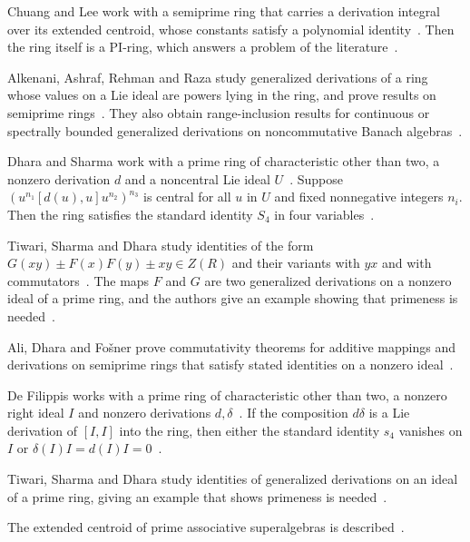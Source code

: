 Chuang and Lee work with a semiprime ring that carries a derivation integral
over its extended centroid, whose constants satisfy a polynomial identity~\cite{WlAlgebraicDerivationsWithConsta2003}.
Then the ring itself is a PI-ring, which answers a problem of the
literature~\cite{WlAlgebraicDerivationsWithConsta2003}.

Alkenani, Ashraf, Rehman and Raza study generalized derivations of a ring
whose values on a Lie ideal are powers lying in the ring, and prove results on
semiprime rings~\cite{WlDerivationsWithPowerValuesOnLi2015}. They also obtain range-inclusion results for continuous or
spectrally bounded generalized derivations on noncommutative Banach
algebras~\cite{WlDerivationsWithPowerValuesOnLi2015}.

Dhara and Sharma work with a prime ring of characteristic other than two, a
nonzero derivation $d$ and a noncentral Lie ideal $U$~\cite{WlDerivationsWithPowerCentralVal2008}. Suppose
$(u^{n_1}[d(u),u]u^{n_2})^{n_3}$ is central for all $u$ in $U$ and fixed
nonnegative integers $n_i$. Then the ring satisfies the standard identity
$S_4$ in four variables~\cite{WlDerivationsWithPowerCentralVal2008}.

Tiwari, Sharma and Dhara study identities of the form $G(xy)\pm F(x)F(y)\pm
xy\in Z(R)$ and their variants with $yx$ and with commutators~\cite{WlIdentitiesRelatedToGeneralized2016}. The maps $F$
and $G$ are two generalized derivations on a nonzero ideal of a prime ring,
and the authors give an example showing that primeness is
needed~\cite{WlIdentitiesRelatedToGeneralized2016}.

Ali, Dhara and Fo\v{s}ner prove commutativity theorems for additive mappings
and derivations on semiprime rings that satisfy stated identities on a nonzero
ideal~\cite{WlSomeCommutativityTheoremsConce2012}.

De Filippis works with a prime ring of characteristic other than two, a
nonzero right ideal $I$ and nonzero derivations $d,\delta$~\cite{WlProductsOfDerivationsWhichActA2006}. If the composition
$d\delta$ is a Lie derivation of $[I,I]$ into the ring, then either the
standard identity $s_4$ vanishes on $I$ or
$\delta(I)I=d(I)I=0$~\cite{WlProductsOfDerivationsWhichActA2006}.

Tiwari, Sharma and Dhara study identities of generalized derivations on an
ideal of a prime ring, giving an example that shows primeness is
needed~\cite{WlIdentitiesRelatedToGeneralized2020}.

The extended centroid of prime associative superalgebras is
described~\cite{WlOnTheExtendedCentroidOfPrimeAs2020}.

